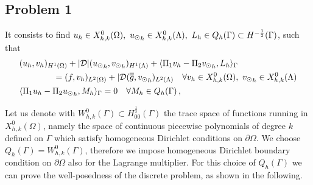 \subsection{Problem 1}It consists to find $u_h \in X_{h,k}^0 (\Omega) ,\ {u_{\odot}}_h \in X_{h,k}^0(\Lambda) , \ L_h \in Q_h(\Gamma) \subset H^{-\frac12}(\Gamma )$, such that
\begin{subequations}
\begin{align}
&(u_h,v_h)_{H^1(\Omega)} + |{\cal D}| ({\ud}_h,{\vd}_h)_{H^1(\Lambda)} 
+ \langle \Pi_1 v_h  - \Pi_2 {\vd}_h, L_h \rangle_\Gamma 
\\
\nonumber
&\qquad\qquad= (f,v_h)_{L^2(\Omega)} + |{\cal D}(\avrd{g},{\vd}_h)_{L^2(\Lambda)}
\quad \forall v_h \in X_{h,k}^0(\Omega), \ {\vd}_h \in X_{h,k}^0(\Lambda)
\\
&   \langle \Pi_1 u_h - \Pi_2 {\ud}_h , M_h \rangle_\Gamma = 0
\quad \forall M_h \in Q_h(\Gamma)\,,
\end{align}
\end{subequations}

Let us denote with $W_{h,k}^0(\Gamma) \subset H^{\frac 12}_{00}(\Gamma)$ the trace space of functions running in $X_{h,k}^0(\Omega)$, namely the space of continuous piecewise polynomials of degree $k$ defined on $\Gamma$ which satisfy homogeneous Dirichlet conditions on $\partial \Omega$. We choose $Q_h(\Gamma)=W_{h,k}^0(\Gamma)$, therefore we impose homogeneous Dirichlet boundary condition on $\partial \Omega$ also for the Lagrange multiplier. For this choice of $Q_h(\Gamma)$ we can prove the well-posedness of the discrete problem, as shown in the following. 

